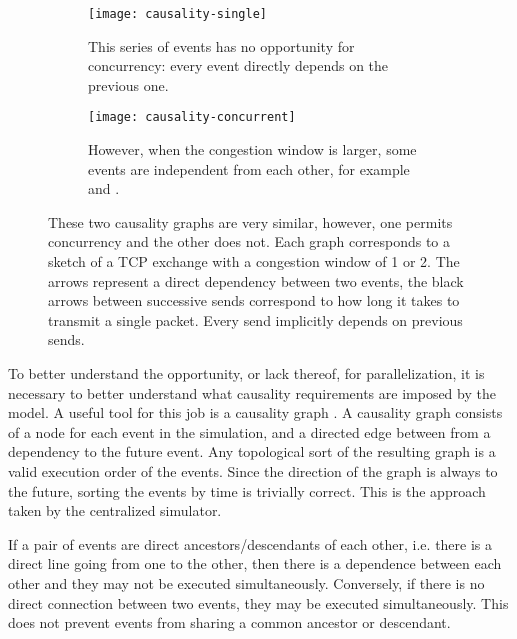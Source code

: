 \begin{figure}
    \centering
    \begin{subfigure}[t]{0.45\textwidth}
        \centering
        \texttt{[image: causality-single]}
        \caption{
            This series of events has no opportunity for concurrency: every event directly depends on the previous one.
        }
        \label{causality-graph-seq:fig}
    \end{subfigure}
    \begin{subfigure}[t]{0.45\textwidth}
        \centering
        \texttt{[image: causality-concurrent]}
        \caption{
            However, when the congestion window is larger, some events are independent from each other, for example  and . 
        }
        \label{causality-graph-para:fig}
    \end{subfigure}
    \caption{
        These two causality graphs are very similar, however, one permits concurrency and the other does not.
        Each graph corresponds to a sketch of a TCP exchange with a congestion window of 1 or 2.
        The arrows represent a direct dependency between two events, the black arrows between successive sends correspond to how long it takes to transmit a single packet.
        Every send implicitly depends on previous sends.
    }
    \label{causality-graph:fig}
\end{figure}

To better understand the opportunity, or lack thereof, for parallelization, it is necessary to better understand what causality requirements are imposed by the model.
A useful tool for this job is a causality graph \cite{misra_distributed_1986}.
A causality graph consists of a node for each event in the simulation, and a directed edge between from a dependency to the future event.
Any topological sort of the resulting graph is a valid execution order of the events.
Since the direction of the graph is always to the future, sorting the events by time is trivially correct.
This is the approach taken by the centralized simulator.

If a pair of events are direct ancestors/descendants of each other, i.e. there is a direct line going from one to the other, then there is a dependence between each other and they may not be executed simultaneously.
Conversely, if there is no direct connection between two events, they may be executed simultaneously.
This does not prevent events from sharing a common ancestor or descendant.

